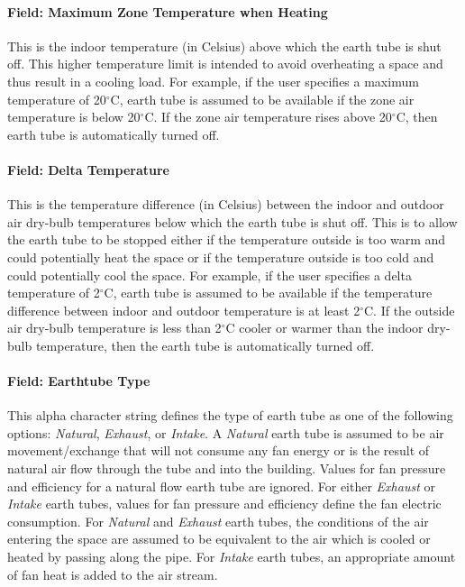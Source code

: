 \paragraph{Field: Maximum Zone Temperature when Heating}\label{field-maximum-zone-temperature-when-heating}

This is the indoor temperature (in Celsius) above which the earth tube is shut off. This higher temperature limit is intended to avoid overheating a space and thus result in a cooling load. For example, if the user specifies a maximum temperature of 20$^\circ$C, earth tube is assumed to be available if the zone air temperature is below 20$^\circ$C. If the zone air temperature rises above 20$^\circ$C, then earth tube is automatically turned off.

\paragraph{Field: Delta Temperature}\label{field-delta-temperature-4}

This is the temperature difference (in Celsius) between the indoor and outdoor air dry-bulb temperatures below which the earth tube is shut off. This is to allow the earth tube to be stopped either if the temperature outside is too warm and could potentially heat the space or if the temperature outside is too cold and could potentially cool the space. For example, if the user specifies a delta temperature of 2$^\circ$C, earth tube is assumed to be available if the temperature difference between indoor and outdoor temperature is at least 2$^\circ$C. If the outside air dry-bulb temperature is less than 2$^\circ$C cooler or warmer than the indoor dry-bulb temperature, then the earth tube is automatically turned off.

\paragraph{Field: Earthtube Type}\label{field-earthtube-type}

This alpha character string defines the type of earth tube as one of the following options: \emph{Natural}, \emph{Exhaust}, or \emph{Intake}. A \emph{Natural} earth tube is assumed to be air movement/exchange that will not consume any fan energy or is the result of natural air flow through the tube and into the building. Values for fan pressure and efficiency for a natural flow earth tube are ignored. For either \emph{Exhaust} or \emph{Intake} earth tubes, values for fan pressure and efficiency define the fan electric consumption. For \emph{Natural} and \emph{Exhaust} earth tubes, the conditions of the air entering the space are assumed to be equivalent to the air which is cooled or heated by passing along the pipe. For \emph{Intake} earth tubes, an appropriate amount of fan heat is added to the air stream.

